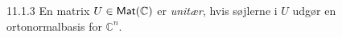 %
%

\begin{definition}{11.1.3}
	En matrix $U \in \textsf{Mat}(\mathbb{C})$ er \emph{unitær}, hvis søjlerne i $U$
	udgør en ortonormalbasis for $\mathbb{C}^n$.
\end{definition}

